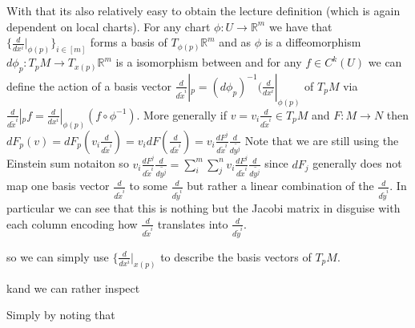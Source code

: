 With that its also relatively easy to obtain the lecture definition (which is again dependent on local charts).
For any chart \( \phi : U \to \mathbb{R}^m \) we have that \( \{\frac{d}{dx^i}|_{\phi(p)}\}_{i \in [m]} \) forms a basis of \( T_{\phi(p)} \mathbb{R}^m \)
and as \( \phi \) is a diffeomorphism \( d\phi_p : T_p M \to T_{x(p)} \mathbb{R}^m \) is a isomorphism between and for any \( f \in C^k(U) \)
we can define the action of a basis vector \( \frac{d}{d\tilde{x}^i}|_p = (d\phi_p)^{-1}(\frac{d}{dx^i}|_{\phi(p)}\) of \( T_p M \) via
\( \frac{d}{d\tilde{x}^i}|_p f = \frac{d}{dx^i}|_{\phi(p)}(f \circ \phi^{-1}) \).
More generally if \( v = v_i \frac{d}{d\tilde{x}^i} \in T_p M \) and \( F : M \to N \) then
\( dF_p(v) = dF_p(v_i \frac{d}{d\tilde{x}^i}) = v_i dF(\frac{d}{d\tilde{x}^i}) = v_i \frac{dF^j}{d\tilde{x}^i}\frac{d}{d\tilde{y^j}} \)
Note that we are still using the Einstein sum notaiton so 
\( v_i \frac{dF^j}{d\tilde{x}^i}\frac{d}{d\tilde{y^j}} = \sum_i^m \sum_j^n v_i \frac{dF^j}{d\tilde{x}^i}\frac{d}{d\tilde{y^j}} \)
since \(dF_j \) generally does not map one basis vector \( \frac{d}{d\tilde{x}^i} \) to some \( \frac{d}{d\tilde{y}^i} \) but rather
a linear combination of the \( \frac{d}{d\tilde{y}^i} \). In particular we can see that this is nothing but the Jacobi matrix in disguise
with each column encoding how \( \frac{d}{d\tilde{x}^i} \) translates into \( \frac{d}{d\tilde{y}^i} \).

so we can simply use 
\( \{\frac{d}{dx^i}|_{x(p)}\) to describe the basis vectors of \( T_p M \).

kand we can rather inspect

Simply by noting that \(  \)

